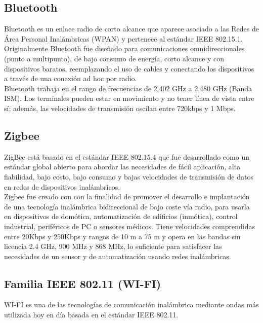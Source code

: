 	\subsection{Bluetooth}
	Bluetooth es un enlace radio de corto alcance que aparece asociado a las Redes de Área Personal Inalámbricas (WPAN) y pertenece al estándar IEEE 802.15.1. Originalmente Bluetooth fue diseñado para comunicaciones omnidireccionales (punto a multipunto), de bajo consumo de energía, corto alcance y con dispositivos baratos, reemplazando el uso de cables y conectando los dispositivos a través de una conexión ad hoc por radio. \\
		
	Bluetooth trabaja en el rango de frecuencias de 2,402 GHz a 2,480 GHz (Banda ISM). Los terminales pueden estar en movimiento y no tener línea de vista entre sí; además, las velocidades de transmisión oscilan entre 720kbps y 1 Mbps. 
	
	\subsection{Zigbee}
	ZigBee está basado en el estándar IEEE 802.15.4 que fue desarrollado como un estándar global abierto para abordar las necesidades de fácil aplicación, alta fiabilidad, bajo costo, bajo consumo y bajas velocidades de transmisión de datos en redes de dispositivos inalámbricos.\\
		
	Zigbee fue creado con  con la finalidad de promover el desarrollo e implantación de una tecnología inalámbrica bidireccional de bajo coste vía radio, para usarla en dispositivos de domótica, automatización de edificios (inmótica), control industrial, periféricos de PC o sensores médicos.  Tiene velocidades comprendidas entre 20Kbps y 250Kbps y rangos de 10 m a 75 m y opera en las bandas sin licencia 2.4 GHz, 900 MHz y 868 MHz, lo suficiente para satisfacer las necesidades de un sensor y de automatización usando redes inalámbricas.
	
	\subsection{Familia IEEE 802.11 (WI-FI)}
	WI-FI es una de las tecnologías de comunicación inalámbrica mediante ondas más utilizada hoy en día basada en el estándar IEEE 802.11. 
	
